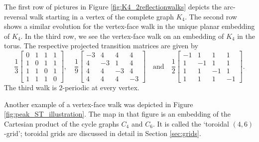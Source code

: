 \documentclass{article}
\numberwithin{equation}{section}
\begin{document}
The first row of pictures in Figure \ref{fig:K4_2reflectionwalks} depicts the arc-reversal walk starting in a vertex of the complete graph $K_4$. The second row shows a similar evolution for the vertex-face walk in the unique planar embedding of $K_4$. In the third row, we see the vertex-face walk on an embedding of $K_4$ in the torus. The respective projected transition matrices are given by
\[
\frac{1}{3}
\left[
\begin{array}{rrrr}
0 & 1 & 1 & 1 \\
1 & 0 & 1 & 1 \\
1 & 1 & 0 & 1 \\
1 & 1 & 1 & 0
\end{array}\right],\quad
\frac{1}{9}
\left[
\begin{array}{rrrr}
-3 & 4 & 4 & 4 \\
4 & -3 & 1 & 4 \\
4 & 4 & -3 & 4 \\
4 & 4 & 4 & -3
\end{array}\right] \quad \text{and} \quad
\frac{1}{2}
\left[
\begin{array}{rrrr}
-1 & 1 & 1 & 1 \\
1 & -1 & 1 & 1 \\
1 & 1 & -1 & 1 \\
1 & 1 & 1 & -1
\end{array}\right].
\]
The third walk is $2$-periodic at every vertex.


Another example of a vertex-face walk was depicted in Figure \ref{fig:peak_ST_illustration}. The map in that figure is an embedding of the Cartesian product of the cycle graphs $C_4$ and $C_6$. It is called the `toroidal $(4,6)$-grid'; toroidal grids are discussed in detail in Section \ref{sec:grids}.
\end{document}
